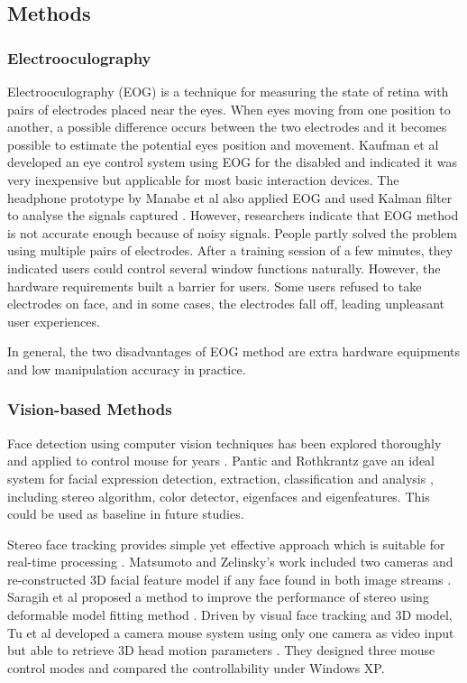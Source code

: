 \documentclass{sigchi}
\begin{document}
\subsection{Methods}

\subsubsection{Electrooculography}
Electrooculography (EOG) is a technique for measuring the state of retina with pairs of electrodes placed near the eyes.
When eyes moving from one position to another, a possible difference occurs between the two electrodes and it becomes possible to estimate the potential eyes position and movement.
Kaufman et al developed an eye control system using EOG for the disabled \cite{kaufman1993eye} and indicated it was very inexpensive but applicable for most basic interaction devices.
The headphone prototype by Manabe et al also applied EOG and used Kalman filter to analyse the signals captured \cite{manabe2006full}. 
However, researchers indicate that EOG method is not accurate enough because of noisy signals.
People partly solved the problem using multiple pairs of electrodes.
After a training session of a few minutes, they indicated users could control several window functions naturally. 
However, the hardware requirements built a barrier for users.
Some users refused to take electrodes on face, and in some cases, the electrodes fall off, leading unpleasant user experiences.

In general, the two disadvantages of EOG method are extra hardware equipments and low manipulation accuracy in practice.

\subsubsection{Vision-based Methods}
Face detection using computer vision techniques has been explored thoroughly and applied to control mouse for years \cite{ware1987evaluation}.
Pantic and Rothkrantz gave an ideal system for facial expression detection, extraction, classification and analysis \cite{pantic2000automatic}, including stereo algorithm, color detector, eigenfaces and eigenfeatures.
This could be used as baseline in future studies. 

Stereo face tracking provides simple yet effective approach which is suitable for real-time processing \cite{matsumoto2000algorithm} \cite{saragih2011deformable} \cite{tu2007face} \cite{gorodnichy2004nouse}.
Matsumoto and Zelinsky's work included two cameras and re-constructed 3D facial feature model if any face found in both image streams \cite{matsumoto2000algorithm}.
Saragih et al proposed a method to improve the performance of stereo using deformable model fitting method \cite{saragih2011deformable}.
Driven by visual face tracking and 3D model, Tu et al developed a camera mouse system using only one camera as video input but able to retrieve 3D head motion parameters \cite{tu2007face}.
They designed three mouse control modes and compared the controllability under Windows XP.
\end{document}
